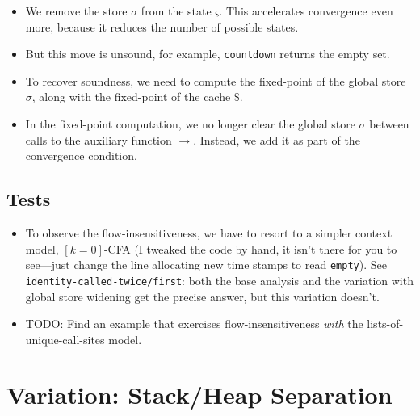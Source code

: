 \documentclass[12pt, oneside]{book}
\begin{document}
\begin{itemize}
  \item We remove the store \(σ\) from the state \(ς\). This accelerates convergence even more, because it reduces the number of possible states.
  \item But this move is unsound, for example, \texttt{countdown} returns the empty set.
  \item To recover soundness, we need to compute the fixed-point of the global store \(σ\), along with the fixed-point of the cache \(\$\).
  \item In the fixed-point computation, we no longer clear the global store \(σ\) between calls to the auxiliary function \(→\). Instead, we add it as part of the convergence condition.
\end{itemize}

\subsection{Tests}

\begin{itemize}
  \item To observe the flow-insensitiveness, we have to resort to a simpler context model, \([k=0]\)-CFA (I tweaked the code by hand, it isn’t there for you to see—just change the line allocating new time stamps to read \texttt{empty}). See \texttt{identity-called-twice/first}: both the base analysis and the variation with global store widening get the precise answer, but this variation doesn’t.
  \item TODO: Find an example that exercises flow-insensitiveness \emph{with} the lists-of-unique-call-sites model.
\end{itemize}

\section{Variation: Stack/Heap Separation}
\end{document}
